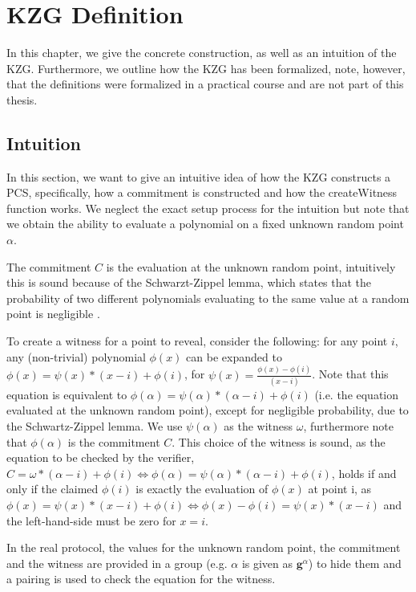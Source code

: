 \chapter{KZG Definition}\label{chapter:defs}
In this chapter, we give the concrete construction, as well as an intuition of the KZG.
Furthermore, we outline how the KZG has been formalized, note, however, that the definitions were formalized in a practical course and are not part of this thesis. 

\section*{Intuition}
In this section, we want to give an intuitive idea of how the KZG constructs a PCS, specifically, how a commitment is constructed and how the createWitness function works. 
We neglect the exact setup process for the intuition but note that we obtain the ability to evaluate a polynomial on a fixed unknown random point $\alpha$.

The commitment $C$ is the evaluation at the unknown random point, intuitively this is sound because of the Schwarzt-Zippel lemma, which states that the probability of two different polynomials evaluating to the same value at a random point is negligible \parencite{thalerbook}.

To create a witness for a point to reveal, consider the following:
for any point $i$, any (non-trivial) polynomial $\phi(x)$ can be expanded to $\phi(x)=\psi(x)*(x-i) + \phi(i)$, for $\psi(x) = \frac{\phi(x)-\phi(i)}{(x-i)}$. Note that this equation is equivalent to $\phi(\alpha)=\psi(\alpha)*(\alpha-i) + \phi(i)$ (i.e. the equation evaluated at the unknown random point), except for negligible probability, due to the Schwartz-Zippel lemma. We use $\psi(\alpha)$ as the witness $\omega$, furthermore note that $\phi(\alpha)$ is the commitment $C$. 
This choice of the witness is sound, as the equation to be checked by the verifier,
$C=\omega*(\alpha-i) + \phi(i) \iff \phi(\alpha)=\psi(\alpha)*(\alpha-i) + \phi(i)$, holds if and only if the claimed $\phi(i)$ is exactly the evaluation of $\phi(x)$ at point i, as $\phi(x)=\psi(x)*(x-i) + \phi(i) \iff 
\phi(x)-\phi(i)=\psi(x)*(x-i)$ and the left-hand-side must be zero for $x=i$.

In the real protocol, the values for the unknown random point, the commitment and the witness are provided in a group (e.g. $\alpha$ is given as $\mathbf{g}^\alpha$) to hide them and a pairing is used to check the equation for the witness.

